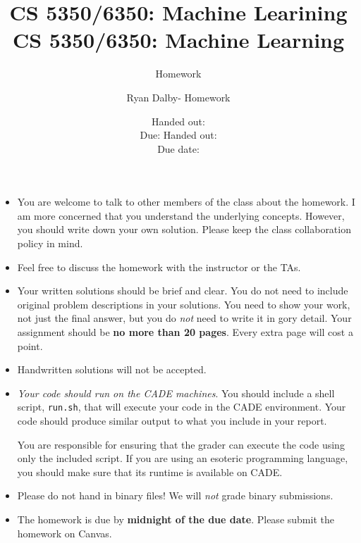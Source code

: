 \documentclass[12pt, fullpage,letterpaper]{article}
\title{CS 5350/6350: Machine Learining \semester}
\author{Homework \assignmentId}
\date{Handed out: \releaseDate\\
	Due: \dueDate}
\title{CS 5350/6350: Machine Learning \semester}
\author{Ryan Dalby- Homework \assignmentId}
\date{Handed out: \releaseDate\\
  Due date: \dueDate}
\begin{document}
\maketitle


{\footnotesize
	\begin{itemize}
		\item You are welcome to talk to other members of the class about
		the homework. I am more concerned that you understand the
		underlying concepts. However, you should write down your own
		solution. Please keep the class collaboration policy in mind.
		
		\item Feel free to discuss the homework with the instructor or the TAs.
		
		\item Your written solutions should be brief and clear. You do not need to include original problem descriptions in your solutions. You need to
		show your work, not just the final answer, but you do \emph{not}
		need to write it in gory detail. Your assignment should be {\bf no
			more than 20 pages}. Every extra page will cost a point.
		
		\item Handwritten solutions will not be accepted.
		
		
		\item {\em Your code should run on the CADE machines}. You should
		include a shell script, {\tt run.sh}, that will execute your code
		in the CADE environment. Your code should produce similar output
		to what you include in your report.
		
		You are responsible for ensuring that the grader can execute the
		code using only the included script. If you are using an
		esoteric programming language, you should make sure that its
		runtime is available on CADE.
		
		\item Please do not hand in binary files! We will {\em not} grade
		binary submissions.
		
		\item The homework is due by \textbf{midnight of the due date}. Please submit
		the homework on Canvas.
		
	\end{itemize}
}
\end{document}
